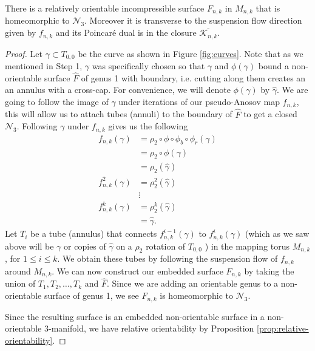 \begin{lem}
\label{lem:genus3}
There is a relatively orientable incompressible surface $F_{n,k}$ in $M_{n,k}$ that is homeomorphic to $\mathcal{N}_3$.
Moreover it is transverse to the suspension flow direction given by $f_{n,k}$ and its Poincar\'e dual is in
the closure $\overline{\mathcal{K}_{n,k}}$.
\end{lem}
\begin{proof}
  Let $\gamma \subset T_{0,0}$ be the curve as shown in Figure \ref{fig:curves}. Note that as we mentioned in Step 1,
  $\gamma$ was specifically chosen so that $\gamma$ and $\phi(\gamma)$ bound a non-orientable surface
  $\hat{F}$ of genus 1 with boundary, i.e. cutting along them creates an an annulus with a cross-cap. For
  convenience, we will denote $\phi(\gamma)$ by $\hat{\gamma}$. We are going to follow the image of $\gamma$
  under iterations of our pseudo-Anosov map $f_{n,k}$, this will allow us to attach tubes (annuli) to the
  boundary of $\hat{F}$ to get a closed $\mathcal{N}_3$. Following $\gamma$ under $f_{n,k}$ gives us the
  following
  \begin{align*}
    f_{n,k}(\gamma) &= \rho_2 \circ \phi \circ \phi_b \circ \phi_r(\gamma) \\
                    &= \rho_2 \circ \phi(\gamma) \\
                    &= \rho_2(\hat{\gamma}) \\
    f^2_{n,k}(\gamma) &= \rho_2^2(\hat{\gamma}) \\
                      &\vdots \\
    f^k_{n,k}(\gamma) &= \rho_2^k(\hat{\gamma})\\
                      &= \hat{\gamma}.
  \end{align*}
  Let $T_i$ be a tube (annulus) that connects $f_{n,k}^{i-1}(\gamma)$ to $f_{n,k}^i(\gamma)$
  (which as we saw above will be $\gamma$ or copies of $\hat{\gamma}$ on a $\rho_2$ rotation of $T_{0,0}$
  ) in the mapping torus $M_{n,k}$, for $1 \leq i \leq k$. We obtain these tubes by following the suspension
  flow of $f_{n,k}$ around $M_{n,k}$. We can now construct our embedded surface $F_{n,k}$ by taking the union of
  $T_1,T_2,\dots,T_k$ and $\hat{F}$. Since we are adding an orientable genus to a non-orientable surface of
  genus 1, we see $F_{n,k}$ is homeomorphic to $\mathcal{N}_3$.

  Since the resulting surface is an embedded non-orientable surface in a non-orientable $3$-manifold, we have
  relative orientability by Proposition \ref{prop:relative-orientability}.


\end{proof}
